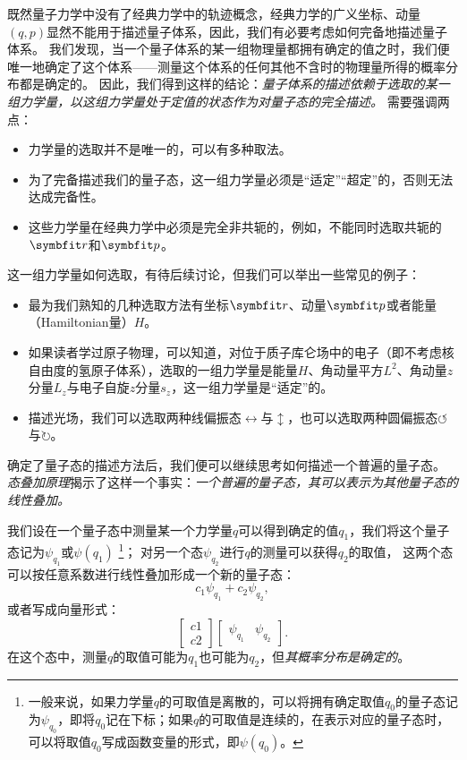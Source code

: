 既然量子力学中没有了经典力学中的轨迹概念，经典力学的广义坐标、动量$(q,p)$显然不能用于描述量子体系，因此，我们有必要考虑如何完备地描述量子体系。
我们发现，当一个量子体系的某一组物理量都拥有确定的值之时，我们便唯一地确定了这个体系——测量这个体系的任何其他不含时的物理量所得的概率分布都是确定的。
因此，我们得到这样的结论：\emph{量子体系的描述依赖于选取的某一组力学量，以这组力学量处于定值的状态作为对量子态的完全描述。}
需要强调两点：
\begin{itemize}
    \item{力学量的选取并不是唯一的，可以有多种取法。}
    \item{为了完备描述我们的量子态，这一组力学量必须是“适定”“超定”的，否则无法达成完备性。}
    \item{这些力学量在经典力学中必须是完全非共轭的，例如，不能同时选取共轭的$\rr$和$\pp$。}
\end{itemize}
这一组力学量如何选取，有待后续讨论，但我们可以举出一些常见的例子：
\begin{itemize}
    \item{最为我们熟知的几种选取方法有坐标$\rr$、动量$\pp$或者能量（Hamiltonian量）$H$。}
    \item{如果读者学过原子物理，可以知道，对位于质子库仑场中的电子（即不考虑核自由度的氢原子体系），选取的一组力学量是能量$H$、角动量平方$L^2$、角动量$z$分量$L_z$与电子自旋$z$分量$s_z$，这一组力学量是“适定”的。}
    \item{描述光场，我们可以选取两种线偏振态$\leftrightarrow$与$\updownarrow$，也可以选取两种圆偏振态$\circlearrowleft$与$\circlearrowright$。}
\end{itemize}

确定了量子态的描述方法后，我们便可以继续思考如何描述一个普遍的量子态。
\emph{态叠加原理}揭示了这样一个事实：\emph{一个普遍的量子态，其可以表示为其他量子态的线性叠加。}

我们设在一个量子态中测量某一个力学量$q$可以得到确定的值$q_1$，我们将这个量子态记为$\psi_{q_1}$或$\psi(q_1)$
\footnote{一般来说，如果力学量$q$的可取值是离散的，可以将拥有确定取值$q_0$的量子态记为$\psi_{q_0}$，即将$q_0$记在下标；如果$q$的可取值是连续的，在表示对应的量子态时，可以将取值$q_0$写成函数变量的形式，即$\psi(q_0)$。}；
对另一个态$\psi_{q_2}$进行$q$的测量可以获得$q_2$的取值，
这两个态可以按任意系数进行线性叠加形成一个新的量子态：
\begin{equation}
    \label{eq:intro_superposition_discrete}
    c_1 \psi_{q_1} + c_2 \psi_{q_2},
\end{equation}
或者写成向量形式：
\begin{equation}
    \begin{bmatrix}
        c1 \\ c2
    \end{bmatrix}
    \begin{bmatrix}
        \psi_{q_1} & \psi_{q_2}
    \end{bmatrix}.
\end{equation}
在这个态中，测量$q$的取值可能为$q_1$也可能为$q_2$，但\emph{其概率分布是确定的}。

